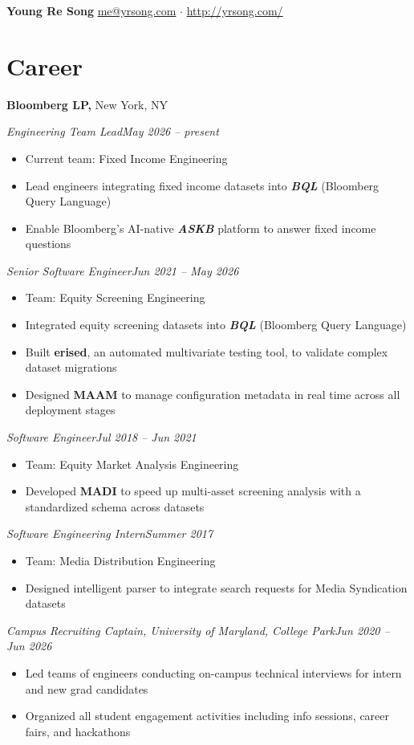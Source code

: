 \documentclass[11pt,letterpaper]{article}
\newcommand{\entry}[3]{\textbf{#1}#2\hfill\textit{#3}\par}
\newcommand{\kw}[1]{\textbf{\textit{#1}}}
\newcommand{\role}[2]{\hspace*{1.2em}\textit{#1}\hfill\textit{#2}\par}
\newenvironment{roleitems}{\begin{itemize}[leftmargin=3.4em]}{\end{itemize}}
\begin{document}
{\LARGE\bfseries Young Re Song}\hfill
\href{mailto:me@yrsong.com}{me@yrsong.com} $\cdot$ \href{http://yrsong.com/}{http://yrsong.com/}

\section*{Career}
\entry{Bloomberg LP,}{ New York, NY}{}
\role{Engineering Team Lead}{May 2026 -- present}
\begin{roleitems}
  \item Current team: Fixed Income Engineering
  \item Lead engineers integrating fixed income datasets into \kw{BQL} (Bloomberg Query Language)
  \item Enable Bloomberg's AI-native \kw{ASKB} platform to answer fixed income questions
\end{roleitems}
\role{Senior Software Engineer}{Jun 2021 -- May 2026}
\begin{roleitems}
  \item Team: Equity Screening Engineering
  \item Integrated equity screening datasets into \kw{BQL} (Bloomberg Query Language)
  \item Built \textbf{erised}, an automated multivariate testing tool, to validate complex dataset migrations
  \item Designed \textbf{MAAM} to manage configuration metadata in real time across all deployment stages
\end{roleitems}
\role{Software Engineer}{Jul 2018 -- Jun 2021}
\begin{roleitems}
  \item Team: Equity Market Analysis Engineering
  \item Developed \textbf{MADI} to speed up multi-asset screening analysis with a standardized schema across datasets
\end{roleitems}
\role{Software Engineering Intern}{Summer 2017}
\begin{roleitems}
  \item Team: Media Distribution Engineering
  \item Designed intelligent parser to integrate search requests for Media Syndication datasets
\end{roleitems}
\role{Campus Recruiting Captain, University of Maryland, College Park}{Jun 2020 -- Jun 2026}
\begin{roleitems}
  \item Led teams of engineers conducting on-campus technical interviews for intern and new grad candidates
  \item Organized all student engagement activities including info sessions, career fairs, and hackathons
\end{roleitems}
\end{document}
